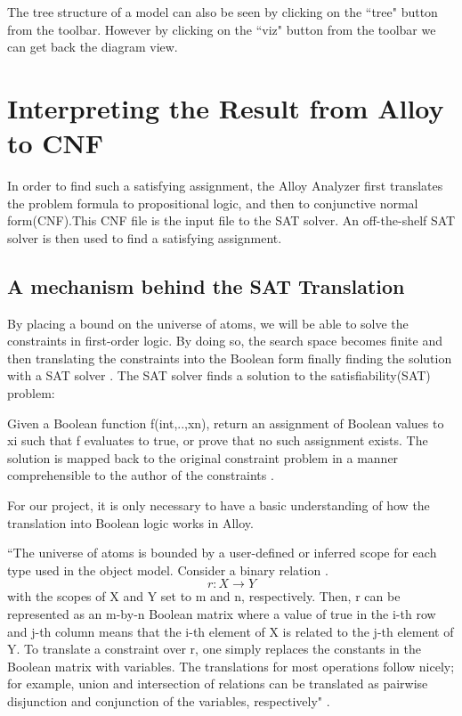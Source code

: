\documentclass[a4paper,12pt]{report}
\begin{document}
The tree structure of a model can also be seen by clicking on the ``tree" button from the toolbar. However by clicking on the ``viz" button from the toolbar we can get back the diagram view.

\chapter{Interpreting the Result from Alloy to CNF} 
In order to find such a satisfying assignment, the Alloy Analyzer first translates the problem formula to propositional logic, and then to conjunctive normal form(CNF).This CNF file is the input file to the SAT solver. An off-the-shelf SAT solver is then used to find a satisfying assignment.

\section{A mechanism behind the SAT Translation}
\label{A view from behind}

By placing a bound on the universe of atoms, we will be able to solve the constraints in first-order logic. By doing so, the search space becomes finite and then translating the constraints into the Boolean form finally finding the solution with a SAT solver \cite{O.Strichman}. The SAT solver finds a solution to the satisfiability(SAT) problem: 

Given a Boolean function f(int,..,xn), return an assignment of Boolean values to xi such that f evaluates to true, or prove that no such assignment exists. The solution is mapped back to the original constraint problem in a manner comprehensible to the author of the constraints \cite{Yeung2005}.

For our project, it is only necessary to have a basic understanding of how the translation into Boolean logic works in Alloy. 
 
``The universe of atoms is bounded by a user-defined or inferred scope for each type used in the object model. Consider a binary relation .
\begin{equation}
r : X \rightarrow Y
\end{equation} 
with the scopes of X and Y set to m and n, respectively. Then, r can be represented as an m-by-n Boolean matrix where a value of true in the i-th row and j-th column means that the i-th element of X is related to the j-th element of Y. To translate a constraint over r, one simply replaces the constants in the Boolean matrix with variables. The translations for most operations follow nicely; for example, union and intersection of relations can be translated as pairwise disjunction and conjunction of the variables, respectively" \cite{Yeung2005}.
\end{document}
